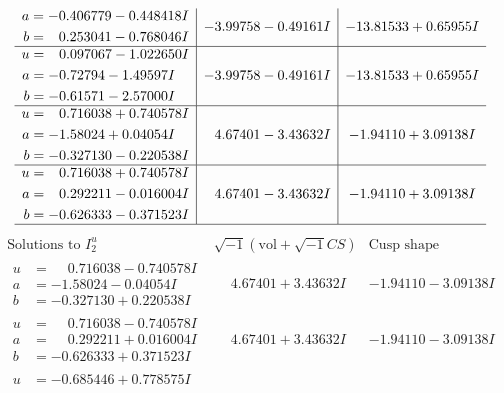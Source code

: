 \documentclass[1p]{elsarticle_modified}
\theoremstyle{definition}
\newcommand{\I}{\sqrt{-1}}
\begin{document}
$$\begin{array}{c|c|c}
\begin{aligned}
a &= -0.406779 - 0.448418 I \\
b &= \phantom{-}0.253041 - 0.768046 I\end{aligned}
 & -3.99758 - 0.49161 I & -13.81533 + 0.65955 I \\ \hline\begin{aligned}
u &= \phantom{-}0.097067 - 1.022650 I \\
a &= -0.72794 - 1.49597 I \\
b &= -0.61571 - 2.57000 I\end{aligned}
 & -3.99758 - 0.49161 I & -13.81533 + 0.65955 I \\ \hline\begin{aligned}
u &= \phantom{-}0.716038 + 0.740578 I \\
a &= -1.58024 + 0.04054 I \\
b &= -0.327130 - 0.220538 I\end{aligned}
 & \phantom{-}4.67401 - 3.43632 I & -1.94110 + 3.09138 I \\ \hline\begin{aligned}
u &= \phantom{-}0.716038 + 0.740578 I \\
a &= \phantom{-}0.292211 - 0.016004 I \\
b &= -0.626333 - 0.371523 I\end{aligned}
 & \phantom{-}4.67401 - 3.43632 I & -1.94110 + 3.09138 I\\
 \hline 
 \end{array}$$\newpage$$\begin{array}{c|c|c}  
\text{Solutions to }I^u_{2}& \I (\text{vol} + \sqrt{-1}CS) & \text{Cusp shape}\\
 \hline 
\begin{aligned}
u &= \phantom{-}0.716038 - 0.740578 I \\
a &= -1.58024 - 0.04054 I \\
b &= -0.327130 + 0.220538 I\end{aligned}
 & \phantom{-}4.67401 + 3.43632 I & -1.94110 - 3.09138 I \\ \hline\begin{aligned}
u &= \phantom{-}0.716038 - 0.740578 I \\
a &= \phantom{-}0.292211 + 0.016004 I \\
b &= -0.626333 + 0.371523 I\end{aligned}
 & \phantom{-}4.67401 + 3.43632 I & -1.94110 - 3.09138 I \\ \hline\begin{aligned}
u &= -0.685446 + 0.778575 I \\

\end{aligned}
\end{array}$$
\end{document}
